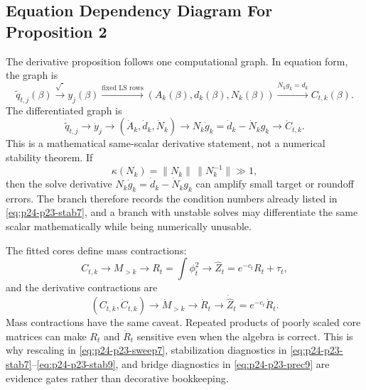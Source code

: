\documentclass[11pt]{article}
\numberwithin{equation}{section}
\begin{document}
\subsection*{Equation Dependency Diagram For Proposition 2}

The derivative proposition follows one computational graph.  In equation form,
the graph is
\begin{equation}
    \widetilde q_{t,j}(\beta)
    \xrightarrow{\sqrt{\cdot}}
    y_j(\beta)
    \xrightarrow{\text{fixed LS rows}}
    (A_k(\beta),d_k(\beta),N_k(\beta))
    \xrightarrow{N_kg_k=d_k}
    C_{t,k}(\beta).
    \label{eq:p24-p23-gdag1}
\end{equation}
The differentiated graph is
\begin{equation}
    \dot{\widetilde q}_{t,j}
    \to
    \dot y_j
    \to
    (\dot A_k,\dot d_k,\dot N_k)
    \to
    N_k\dot g_k=\dot d_k-\dot N_k g_k
    \to
    \dot C_{t,k}.
    \label{eq:p24-p23-gdag2}
\end{equation}
This is a mathematical same-scalar derivative statement, not a numerical
stability theorem.  If
\begin{equation}
    \kappa(N_k)
    =
    \|N_k\|\,\|N_k^{-1}\|
    \gg 1,
    \label{eq:p24-p23-gdag2a}
\end{equation}
then the solve derivative
\(N_k\dot g_k=\dot d_k-\dot N_kg_k\) can amplify small target or roundoff
errors.  The branch therefore records the condition numbers already listed in
\eqref{eq:p24-p23-stab7}, and a branch with unstable solves may differentiate the same
scalar mathematically while being numerically unusable.

The fitted cores define mass contractions:
\begin{equation}
    C_{t,k}
    \to
    M_{>k}
    \to
    R_t=\int\phi_t^2
    \to
    \widehat Z_t=e^{-c_t}R_t+\tau_t,
    \label{eq:p24-p23-gdag3}
\end{equation}
and the derivative contractions are
\begin{equation}
    (C_{t,k},\dot C_{t,k})
    \to
    \dot M_{>k}
    \to
    \dot R_t
    \to
    \dot{\widehat Z}_t=e^{-c_t}\dot R_t.
    \label{eq:p24-p23-gdag4}
\end{equation}
Mass contractions have the same caveat.  Repeated products of poorly scaled
core matrices can make \(R_t\) and \(\dot R_t\) sensitive even when the algebra
is correct.  This is why rescaling in \eqref{eq:p24-p23-sweep7}, stabilization diagnostics
in \eqref{eq:p24-p23-stab7}--\eqref{eq:p24-p23-stab9}, and bridge diagnostics in \eqref{eq:p24-p23-prec9} are
evidence gates rather than decorative bookkeeping.
\end{document}
